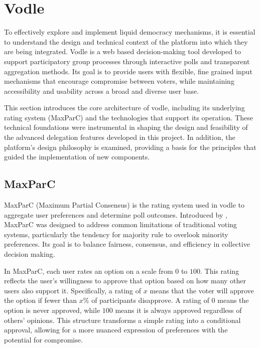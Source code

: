 \section{Vodle}
To effectively explore and implement liquid democracy mechanisms, it is essential to understand the design and technical context of the platform into which they are being integrated. Vodle is a web based decision-making tool developed to support participatory group processes through interactive polls and transparent aggregation methods. Its goal is to provide users with flexible, fine grained input mechanisms that encourage compromise between voters, while maintaining accessibility and usability across a broad and diverse user base.

This section introduces the core architecture of vodle, including its underlying rating system (MaxParC) and the technologies that support its operation. These technical foundations were instrumental in shaping the design and feasibility of the advanced delegation features developed in this project. In addition, the platform's design philosophy is examined, providing a basis for the principles that guided the implementation of new components.


\subsection{MaxParC}
MaxParC (Maximum Partial Consensus) is the rating system used in vodle to aggregate user preferences and determine poll outcomes. Introduced by \citet{heitzig_fair_2024}, MaxParC was designed to address common limitations of traditional voting systems, particularly the tendency for majority rule to overlook minority preferences. Its goal is to balance fairness, consensus, and efficiency in collective decision making.

In MaxParC, each user rates an option on a scale from $0$ to $100$. This rating reflects the user's willingness to approve that option based on how many other users also support it. Specifically, a rating of $x$ means that the voter will approve the option if fewer than $x\%$ of participants disapprove. A rating of $0$ means the option is never approved, while $100$ means it is always approved regardless of others' opinions. This structure transforms a simple rating into a conditional approval, allowing for a more nuanced expression of preferences with the potential for compromise.

